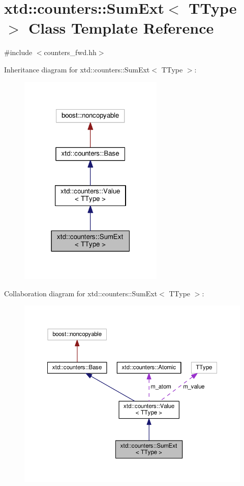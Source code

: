 \hypertarget{classxtd_1_1counters_1_1SumExt}{}\section{xtd\+:\+:counters\+:\+:Sum\+Ext$<$ T\+Type $>$ Class Template Reference}
\label{classxtd_1_1counters_1_1SumExt}


{\ttfamily \#include $<$counters\+\_\+fwd.\+hh$>$}



Inheritance diagram for xtd\+:\+:counters\+:\+:Sum\+Ext$<$ T\+Type $>$\+:
\nopagebreak
\begin{figure}[H]
\begin{center}
\leavevmode
\includegraphics[width=195pt]{classxtd_1_1counters_1_1SumExt__inherit__graph}
\end{center}
\end{figure}


Collaboration diagram for xtd\+:\+:counters\+:\+:Sum\+Ext$<$ T\+Type $>$\+:
\nopagebreak
\begin{figure}[H]
\begin{center}
\leavevmode
\includegraphics[width=350pt]{classxtd_1_1counters_1_1SumExt__coll__graph}
\end{center}
\end{figure}
